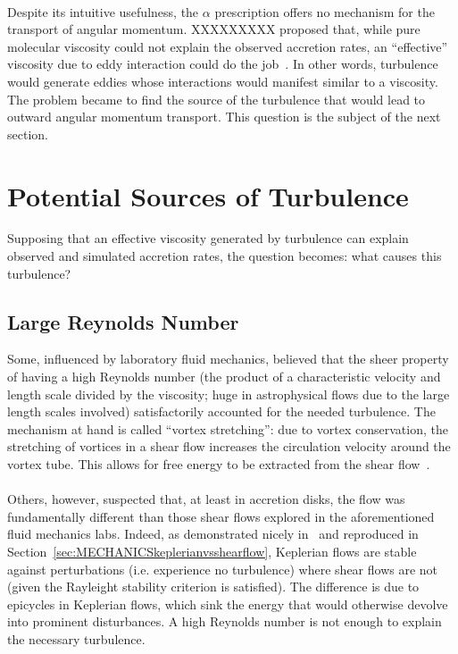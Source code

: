 \\
Despite its intuitive usefulness, the $\alpha$ prescription offers no mechanism for the transport of angular momentum. XXXXXXXXX proposed that, while pure molecular viscosity could not explain the observed accretion rates, an ``effective'' viscosity due to eddy interaction could do the job~\cite{XXXXXX}. In other words, turbulence would generate eddies whose interactions would manifest similar to a viscosity. The problem became to find the source of the turbulence that would lead to outward angular momentum transport. This question is the subject of the next section.

\section{Potential Sources of Turbulence}
Supposing that an effective viscosity generated by turbulence can explain observed and simulated accretion rates, the question becomes: what causes this turbulence? 
\subsection{Large Reynolds Number}
Some, influenced by laboratory fluid mechanics, believed that the sheer property of having a high Reynolds number (the product of a characteristic velocity and length scale divided by the viscosity; huge in astrophysical flows due to the large length scales involved) satisfactorily accounted for the needed turbulence. The mechanism at hand is called ``vortex stretching'': due to vortex conservation, the stretching of vortices in a shear flow increases the circulation velocity around the vortex tube. This allows for free energy to be extracted from the shear flow~\cite{BH1998}.\\
\\
Others, however, suspected that, at least in accretion disks, the flow was fundamentally different than those shear flows explored in the aforementioned fluid mechanics labs. Indeed, as demonstrated nicely in~\cite{BH1998:SectionIII.c.1} and reproduced in Section~\ref{sec:MECHANICSkeplerianvsshearflow}, Keplerian flows are stable against perturbations (i.e. experience no turbulence) where shear flows are not (given the Rayleight stability criterion is satisfied). The difference is due to epicycles in Keplerian flows, which sink the energy that would otherwise devolve into prominent disturbances. A high Reynolds number is not enough to explain the necessary turbulence.
